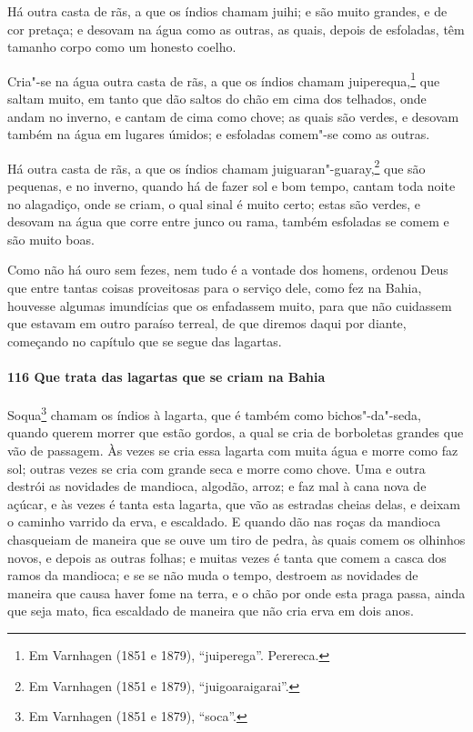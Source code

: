 \begin{linenumbers}
Há outra casta de rãs, a que os índios chamam juihi; e são muito grandes, e de cor
pretaça; e desovam na água como as outras, as quais, depois de esfoladas, têm tamanho
corpo como um honesto coelho.

Cria"-se na água outra casta de rãs, a que os índios chamam juiperequa,\footnote{ Em
Varnhagen (1851 e 1879), ``juiperega''. Perereca.} que saltam muito, em tanto que dão
saltos do chão em cima dos telhados, onde andam no inverno, e cantam de cima como chove;
as quais são verdes, e desovam também na água em lugares úmidos; e esfoladas comem"-se como
as outras.

Há outra casta de rãs, a que os índios chamam juiguaran"-guaray,\footnote{ Em Varnhagen
(1851 e 1879), ``juigoaraigarai''.} que são pequenas, e no inverno, quando há de fazer
sol e bom tempo, cantam toda noite no alagadiço, onde se criam, o qual sinal é muito
certo; estas são verdes, e desovam na água que corre entre junco ou rama, também esfoladas
se comem e são muito boas.

Como não há ouro sem fezes, nem tudo é a vontade dos homens, ordenou Deus que entre tantas
coisas proveitosas para o serviço dele, como fez na Bahia, houvesse algumas imundícias que
os enfadassem muito, para que não cuidassem que estavam em outro paraíso terreal, de que
diremos daqui por diante, começando no capítulo que se segue das lagartas.

\paragraph{116 Que trata das lagartas que se criam na Bahia}\quad
Soqua\footnote{ Em Varnhagen (1851 e 1879), ``soca''.} chamam os índios à lagarta, que é
também como bichos"-da"-seda, quando querem morrer que estão gordos, a qual se cria de
borboletas grandes que vão de passagem. Às vezes se cria essa lagarta com muita água e
morre como faz sol; outras vezes se cria com grande seca e morre como chove. Uma e outra
destrói as novidades de mandioca, algodão, arroz; e faz mal à cana nova de açúcar, e às
vezes é tanta esta lagarta, que vão as estradas cheias delas, e deixam o caminho varrido
da erva, e escaldado. E quando dão nas roças da mandioca chasqueiam de maneira que se ouve
um tiro de pedra, às quais comem os olhinhos novos, e depois as outras folhas; e muitas
vezes é tanta que comem a casca dos ramos da mandioca; e se se não muda o tempo, destroem
as novidades de maneira que causa haver fome na terra, e o chão por onde esta praga passa,
ainda que seja mato, fica escaldado de maneira que não cria erva em dois anos.


\end{linenumbers}
